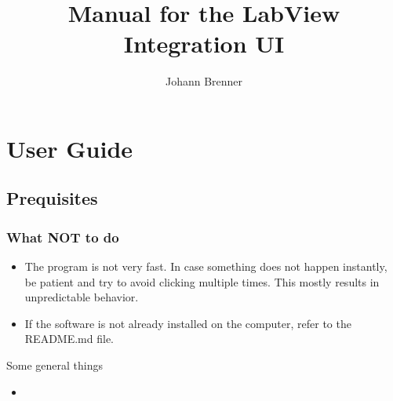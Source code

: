 \documentclass{article}
\title{Manual for the LabView Integration UI}
\author{Johann Brenner}
\begin{document}
	\maketitle
	\tableofcontents 



\section{User Guide}

\subsection{Prequisites}
\subsubsection*{What NOT to do}
\begin{itemize}
	\item	The program is not very fast. In case something does not happen instantly, be patient and try to avoid clicking multiple times. This mostly results in unpredictable behavior.
	\item	If the software is not already installed on the computer, refer to the README.md file.
	
\end{itemize}

Some general things 
\begin{itemize}
	\item 
\end{itemize}
\end{document}
